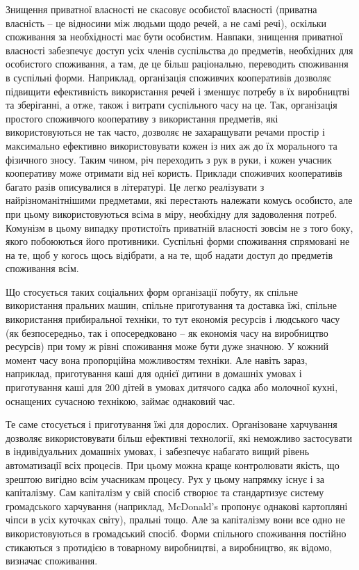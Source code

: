 \documentclass[12pt,a4paper,openany]{book}
\begin{document}
Знищення приватної власності не скасовує особистої власності (приватна власність – це відносини між людьми щодо речей, а не самі речі), оскільки споживання за необхідності має бути особистим. Навпаки, знищення приватної власності забезпечує доступ усіх членів суспільства до предметів, необхідних для особистого споживання, а там, де це більш раціонально, переводить споживання в суспільні форми. Наприклад, організація споживчих кооперативів дозволяє підвищити ефективність використання речей і зменшує потребу в їх виробництві та зберіганні, а отже, також і витрати суспільного часу на це. Так, організація простого споживчого кооперативу з використання предметів, які використовуються не так часто, дозволяє не захаращувати речами простір і максимально ефективно використовувати кожен із них аж до їх морального та фізичного зносу. Таким чином, річ переходить з рук в руки, і кожен учасник кооперативу може отримати від неї користь. Приклади споживчих кооперативів багато разів описувалися в літературі. Це легко реалізувати з найрізноманітнішими предметами, які перестають належати комусь особисто, але при цьому використовуються всіма в міру, необхідну для задоволення потреб. Комунізм в цьому випадку протистоїть приватній власності зовсім не з того боку, якого побоюються його противники. Суспільні форми споживання спрямовані не на те, щоб у когось щось відібрати, а на те, щоб надати доступ до предметів споживання всім.

Що стосується таких соціальних форм організації побуту, як спільне використання пральних машин, спільне приготування та доставка їжі, спільне використання прибиральної техніки, то тут економія ресурсів і людського часу (як безпосередньо, так і опосередковано – як економія часу на виробництво ресурсів) при тому ж рівні споживання може бути дуже значною. У кожний момент часу вона пропорційна можливостям техніки. Але навіть зараз, наприклад, приготування каші для однієї дитини в домашніх умовах і приготування каші для 200 дітей в умовах дитячого садка або молочної кухні, оснащених сучасною технікою, займає однаковий час.

Те саме стосується і приготування їжі для дорослих. Організоване харчування дозволяє використовувати більш ефективні технології, які неможливо застосувати в індивідуальних домашніх умовах, і забезпечує набагато вищий рівень автоматизації всіх процесів. При цьому можна краще контролювати якість, що зрештою вигідно всім учасникам процесу. Рух у цьому напрямку існує і за капіталізму. Сам капіталізм у свій спосіб створює та стандартизує систему громадського харчування (наприклад, McDonald's пропонує однакові картопляні чіпси в усіх куточках світу), пральні тощо. Але за капіталізму вони все одно не використовуються в громадський спосіб. Форми спільного споживання постійно стикаються з протидією в товарному виробництві, а виробництво, як відомо, визначає споживання.
\end{document}
